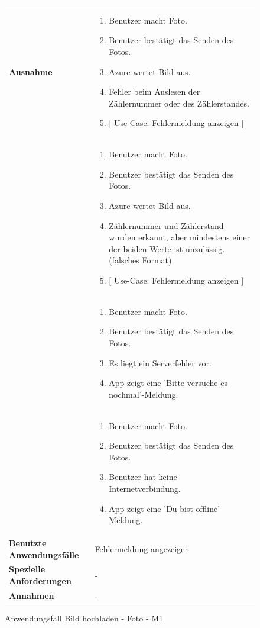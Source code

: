 \begin{figure}[H]
	\centering
	\begin{tabularx}{\textwidth}{ X | X }
	 \hline
		\textbf{Ausnahme} &
		\begin{enumerate}
			\item Benutzer macht Foto.
			\item Benutzer bestätigt das Senden des Fotos.
			\item Azure wertet Bild aus.
			\item Fehler beim Auslesen der Zählernummer oder des Zählerstandes.
			\item $\lbrack$ Use-Case: Fehlermeldung anzeigen $\rbrack$
		\end{enumerate} \\ &
		\begin{enumerate}
			\item Benutzer macht Foto.
			\item Benutzer bestätigt das Senden des Fotos.
			\item Azure wertet Bild aus.
			\item Zählernummer und Zählerstand wurden erkannt, aber mindestens einer der beiden Werte ist unzulässig. (falsches Format)
			\item $\lbrack$ Use-Case: Fehlermeldung anzeigen $\rbrack$
		\end{enumerate} \\  &
		\begin{enumerate}
			\item Benutzer macht Foto.
			\item Benutzer bestätigt das Senden des Fotos.
			\item Es liegt ein Serverfehler vor.
			\item App zeigt eine 'Bitte versuche es nochmal'-Meldung.
		\end{enumerate} \\  &
		\begin{enumerate}
			\item Benutzer macht Foto.
			\item Benutzer bestätigt das Senden des Fotos.
			\item Benutzer hat keine Internetverbindung.
			\item App zeigt eine 'Du bist offline'-Meldung.
		\end{enumerate} \\ \hline
		\textbf{Benutzte Anwendungsfälle} & Fehlermeldung angezeigen \\ \hline
		\textbf{Spezielle Anforderungen} & - \\ \hline
		\textbf{Annahmen} & -
	\end{tabularx}
	\caption{Anwendungsfall Bild hochladen - Foto - M1}
	\label{fig:anwendungsfall-server-tabelle-xx-1}
\end{figure}

